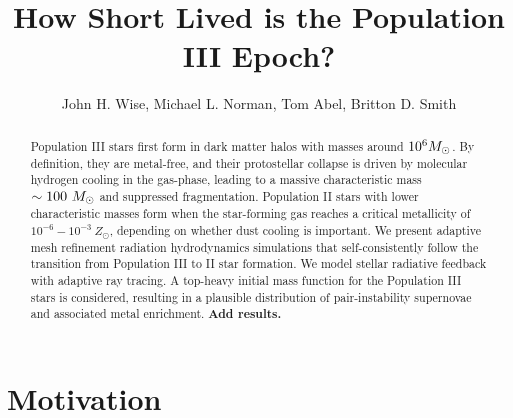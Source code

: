 \documentclass[apjl]{emulateapj}
\begin{document}

\title{How Short Lived is the Population III Epoch?}

\author{John H. Wise, 
  Michael L. Norman,
  Tom Abel,
  Britton D. Smith }


\begin{abstract}

  Population III stars first form in dark matter halos with masses
  around $10^6 \Ms$.  By definition, they are metal-free, and their
  protostellar collapse is driven by molecular hydrogen cooling in the
  gas-phase, leading to a massive characteristic mass $\sim 100~\Ms$
  and suppressed fragmentation.  Population II stars with lower
  characteristic masses form when the star-forming gas reaches a
  critical metallicity of $10^{-6} - 10^{-3}~Z_\odot$, depending on
  whether dust cooling is important.  We present adaptive mesh
  refinement radiation hydrodynamics simulations that
  self-consistently follow the transition from Population III to II
  star formation.  We model stellar radiative feedback with adaptive
  ray tracing.  A top-heavy initial mass function for the Population
  III stars is considered, resulting in a plausible distribution of
  pair-instability supernovae and associated metal enrichment.
  \textbf{Add results.}

\end{abstract}


\section{Motivation}
\end{document}
